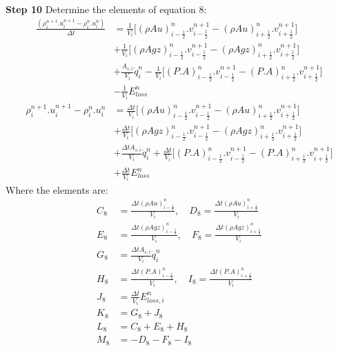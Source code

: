 \documentclass[11pt,letterpaper,titlepage]{article}
\newcommand{\half}{\frac{1}{2}}
\begin{document}
\newpage \noindent
\textbf{Step 10}\newline
Determine the elements of equation 8:
\begin{equation*}
\begin{aligned}
\frac{(\rho_i^{n+1}.u_i^{n+1}-  \rho_i^{n}.u_i^{n})}{\Delta t}&=\frac{1}{V_i}\biggr[ (\rho Au)_{i-\half}^n.v_{i-\half}^{n+1} -(\rho Au)_{i+\half}^n.v_{i+\half}^{n+1} \biggr] \\
&+\frac{1}{V_i}\biggr[ (\rho Agz)_{i-\half}^n.v_{i-\half}^{n+1} -(\rho Agz)_{i+\half}^n.v_{i+\half}^{n+1} \biggr] \\
&+\frac{A_{s,i}}{V_i}\dot{q}_i^n - \frac{1}{V_i}\biggr[   (P.A)_{i-\half}^n.v_{i-\half}^{n+1} - (P.A)_{i+\half}^n.v_{i+\half}^{n+1}   \biggr] \\
&- \frac{1}{V_i}E_{loss}^n
\end{aligned}
\end{equation*}
\begin{equation*}
\begin{aligned}
\rho_i^{n+1}.u_i^{n+1}-\rho_i^{n}.u_i^{n}&=
\frac{\Delta t}{V_i}\biggr[ (\rho Au)_{i-\half}^n.v_{i-\half}^{n+1} -(\rho Au)_{i+\half}^n.v_{i+\half}^{n+1} \biggr] \\
&+\frac{\Delta t}{V_i}\biggr[ (\rho Agz)_{i-\half}^n.v_{i-\half}^{n+1} -(\rho Agz)_{i+\half}^n.v_{i+\half}^{n+1} \biggr] \\
&+\frac{\Delta t A_{s,i}}{V_i}\dot{q}_i^n 
+ \frac{\Delta t}{V_i}\biggr[   (P.A)_{i-\half}^n.v_{i-\half}^{n+1} - (P.A)_{i+\half}^n.v_{i+\half}^{n+1}   \biggr] \\
&+ \frac{\Delta t}{V_i}E_{loss}^n
\end{aligned}
\end{equation*}
\newline
Where the elements are:
\begin{equation*}
\begin{aligned}
C_8&=\frac{\Delta t (\rho Au)_{i-\half}^n}{V_i}, \quad D_8=\frac{\Delta t (\rho Au)_{i+\half}^n}{V_i} \\
E_8&=\frac{\Delta t (\rho Agz)_{i-\half}^n}{V_i}, \quad F_8=\frac{\Delta t (\rho Agz)_{i+\half}^n}{V_i}\\
G_8&=\frac{\Delta t A_{s,i}}{V_i}\dot{q}_i^n \\
H_8&=\frac{\Delta t (P.A)_{i-\half}^n}{V_i}, \quad I_8=\frac{\Delta t (P.A)_{i+\half}^n}{V_i} \\
J_8&=\frac{\Delta t}{V_i}E_{loss,i}^n \\
K_8&=G_8+J_8 \\
L_8&=C_8+E_8+H_8 \\
M_8&=-D_8-F_8-I_8
\end{aligned}
\end{equation*}
\end{document}
